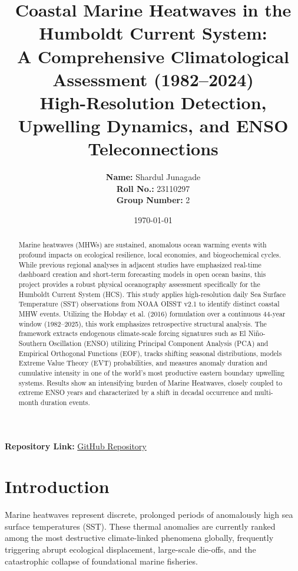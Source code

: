 \documentclass[11pt,a4paper]{article}
\title{\textbf{Coastal Marine Heatwaves in the Humboldt Current System:}\\
\Large A Comprehensive Climatological Assessment (1982--2024)\\
\vspace{0.5em}\large High-Resolution Detection, Upwelling Dynamics, and ENSO Teleconnections}
\author{\textbf{Name:} Shardul Junagade\\
\textbf{Roll No.:} 23110297\\
\textbf{Group Number:} 2}
\date{\today}
\begin{document}
\maketitle

\begin{center}
\textbf{Repository Link:} 
\href{https://github.com/ShardulJunagade/humboldt_marine_heatwaves_project}{GitHub Repository}
\end{center}

\begin{abstract}
Marine heatwaves (MHWs) are sustained, anomalous ocean warming events with profound impacts on ecological resilience, local economies, and biogeochemical cycles. While previous regional analyses in adjacent studies have emphasized real-time dashboard creation and short-term forecasting models in open ocean basins, this project provides a robust physical oceanography assessment specifically for the Humboldt Current System (HCS). This study applies high-resolution daily Sea Surface Temperature (SST) observations from NOAA OISST v2.1 to identify distinct coastal MHW events. Utilizing the Hobday et al. (2016) formulation over a continuous 44-year window (1982--2025), this work emphasizes retrospective structural analysis. The framework extracts endogenous climate-scale forcing signatures such as El Niño-Southern Oscillation (ENSO) utilizing Principal Component Analysis (PCA) and Empirical Orthogonal Functions (EOF), tracks shifting seasonal distributions, models Extreme Value Theory (EVT) probabilities, and measures anomaly duration and cumulative intensity in one of the world's most productive eastern boundary upwelling systems. Results show an intensifying burden of Marine Heatwaves, closely coupled to extreme ENSO years and characterized by a shift in decadal occurrence and multi-month duration events.
\end{abstract}

\newpage
\tableofcontents
\newpage

\section{Introduction}
Marine heatwaves represent discrete, prolonged periods of anomalously high sea surface temperatures (SST). These thermal anomalies are currently ranked among the most destructive climate-linked phenomena globally, frequently triggering abrupt ecological displacement, large-scale die-offs, and the catastrophic collapse of foundational marine fisheries. 
\end{document}
